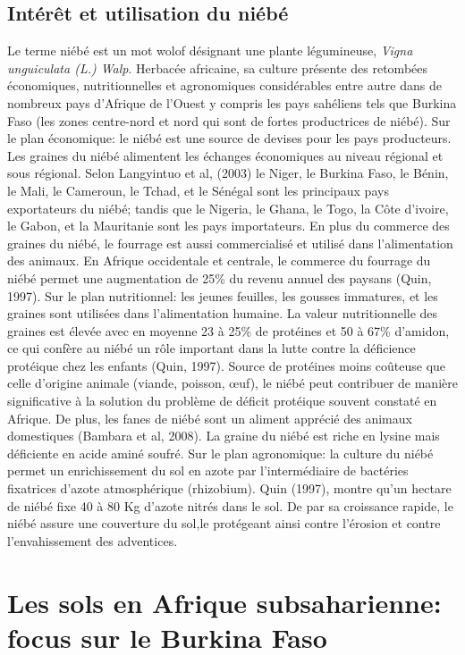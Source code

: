 \documentclass[a4paper,11pt]{article}
\begin{document}
\subsection{Intérêt et utilisation du niébé}

Le terme niébé est un mot wolof désignant une plante légumineuse,
\emph{Vigna unguiculata (L.) Walp}. Herbacée africaine, sa culture
présente des retombées économiques, nutritionnelles et agronomiques
considérables entre autre dans de nombreux pays d'Afrique de l'Ouest y
compris les pays sahéliens tels que Burkina Faso (les zones
centre-nord et nord qui sont de fortes productrices de niébé). Sur le
plan économique: le niébé est une source de devises pour les pays
producteurs. Les graines du niébé alimentent les échanges économiques
au niveau régional et sous régional. Selon Langyintuo et al, (2003) le
Niger, le Burkina Faso, le Bénin, le Mali, le Cameroun, le Tchad, et
le Sénégal sont les principaux pays exportateurs du niébé; tandis que
le Nigeria, le Ghana, le Togo, la Côte d’ivoire, le Gabon, et la
Mauritanie sont les pays importateurs. En plus du commerce des graines
du niébé, le fourrage est aussi commercialisé et utilisé dans
l’alimentation des animaux. En Afrique occidentale et centrale, le
commerce du fourrage du niébé permet une augmentation de 25\% du
revenu annuel des paysans (Quin, 1997). Sur le plan nutritionnel: les
jeunes feuilles, les gousses immatures, et les graines sont utilisées
dans l’alimentation humaine. La valeur nutritionnelle des graines est
élevée avec en moyenne 23 à 25\% de protéines et 50 à 67\% d’amidon,
ce qui confère au niébé un rôle important dans la lutte contre la
déficience protéique chez les enfants (Quin, 1997). Source de
protéines moins coûteuse que celle d’origine animale (viande, poisson,
œuf), le niébé peut contribuer de manière significative à la solution
du problème de déficit protéique souvent constaté en Afrique. De plus,
les fanes de niébé sont un aliment apprécié des animaux domestiques
(Bambara et al, 2008). La graine du niébé est riche en lysine mais
déficiente en acide aminé soufré. Sur le plan agronomique: la culture
du niébé permet un enrichissement du sol en azote par l’intermédiaire
de bactéries fixatrices d’azote atmosphérique (rhizobium). Quin
(1997), montre qu’un hectare de niébé fixe 40 à 80 Kg d’azote nitrés
dans le sol. De par sa croissance rapide, le niébé assure une
couverture du sol,le protégeant ainsi contre l’érosion et contre
l’envahissement des adventices\cite{SAWADOGO_2009}.

\section{Les sols en Afrique subsaharienne: focus sur le Burkina Faso}
\end{document}
